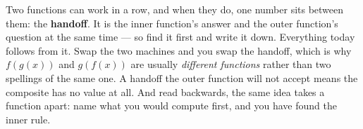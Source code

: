 \documentclass[10pt]{article}
\begin{document}
\vspace{0.14in}

\begin{remindbox}
\small
Two functions can work in a row, and when they do, one number sits between them:
the \textbf{handoff}. It is the inner function's answer and the outer function's
question at the same time --- so find it first and write it down. Everything
today follows from it. Swap the two machines and you swap the handoff, which is
why $f(g(x))$ and $g(f(x))$ are usually \emph{different functions} rather than
two spellings of the same one. A handoff the outer function will not accept
means the composite has no value at all. And read backwards, the same idea takes
a function apart: name what you would compute first, and you have found the
inner rule.
\end{remindbox}
\end{document}
